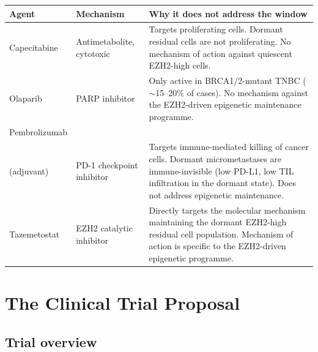 \documentclass[12pt, a4paper]{article}
\begin{document}
\begin{center}
\begin{tabular}{p{3cm}p{4cm}p{5.5cm}}
\toprule
\textbf{Agent} & \textbf{Mechanism}
& \textbf{Why it does not address the window} \\
\midrule
Capecitabine
& Antimetabolite, cytotoxic
& Targets proliferating cells.
  Dormant residual cells are not
  proliferating. No mechanism of
  action against quiescent
  EZH2-high cells. \\[0.3em]
Olaparib
& PARP inhibitor
& Only active in BRCA1/2-mutant
  TNBC ($\sim$15--20\% of cases).
  No mechanism against the EZH2-driven
  epigenetic maintenance programme. \\[0.3em]
Pembrolizumab\\(adjuvant)
& PD-1 checkpoint inhibitor
& Targets immune-mediated killing
  of cancer cells. Dormant
  micrometastases are immune-invisible
  (low PD-L1, low TIL infiltration
  in the dormant state).
  Does not address epigenetic
  maintenance. \\[0.3em]
Tazemetostat
& EZH2 catalytic inhibitor
& Directly targets the molecular
  mechanism maintaining the dormant
  EZH2-high residual cell population.
  Mechanism of action is specific
  to the EZH2-driven epigenetic
  programme. \\
\bottomrule
\end{tabular}
\end{center}

\section{The Clinical Trial Proposal}

\subsection{Trial overview}
\end{document}
